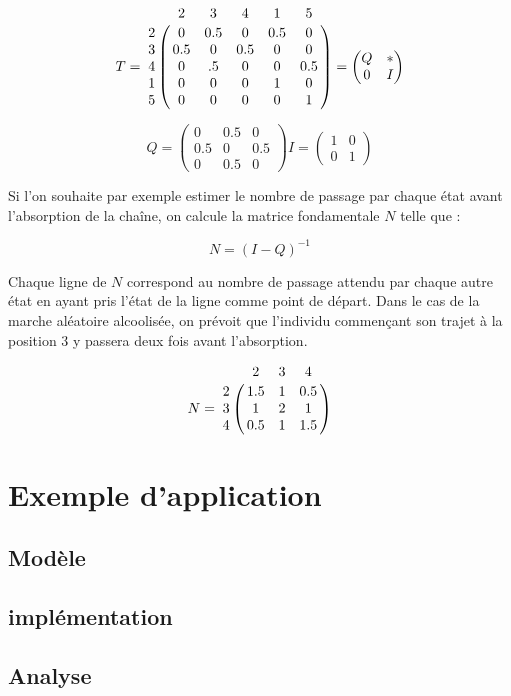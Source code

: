 \documentclass[12pt]{article}
\begin{document}
$$
T = \bordermatrix{
    & 2 & 3 & 4 & 1 & 5 \cr
  2 & 0 & 0.5 & 0 & 0.5 & 0 \cr
  3 & 0.5 & 0 & 0.5 & 0 & 0 \cr
  4 & 0 & .5 & 0 & 0 & 0.5 \cr
  1 & 0 & 0 & 0 & 1 & 0 \cr
  5 & 0 & 0 & 0 & 0 & 1 \cr
}
=
\begin{pmatrix}
  Q & * \\
  0 & I
\end{pmatrix}
$$
\vspace{0.5cm}

$$
Q =
\begin{pmatrix}
  0 & 0.5 & 0 \\
  0.5 & 0 & 0.5 \\
  0 & 0.5 & 0
\end{pmatrix}
I =
\begin{pmatrix}
  1 & 0 \\
  0 & 1
\end{pmatrix}
$$
\vspace{0.5cm}

Si l'on souhaite par exemple estimer le nombre de passage par chaque
état avant l'absorption de la chaîne, on calcule la matrice
fondamentale $N$ telle que :

$$
N = (I - Q)^{-1}
$$

Chaque ligne de $N$ correspond au nombre de passage attendu par chaque
autre état en ayant pris l'état de la ligne comme point de
départ. Dans le cas de la marche aléatoire alcoolisée, on prévoit que
l'individu commençant son trajet à la position 3 y passera deux fois
avant l'absorption.

$$
N =
\bordermatrix{
  & 2 & 3 & 4 \cr
  2 & 1.5 & 1 & 0.5 \cr
  3 & 1 & 2 & 1 \cr
  4 & 0.5 & 1 & 1.5
}
$$

\section{Exemple d'application}

\subsection{Modèle}

\subsection{implémentation}

\subsection{Analyse}

\cite{izq}
\cite{green}



\end{document}
